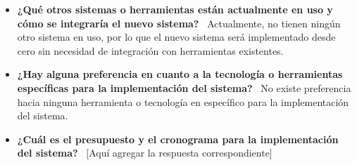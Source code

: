\begin{itemize}
    \item \textbf{¿Qué otros sistemas o herramientas están actualmente en uso y cómo se integraría el nuevo sistema?} \ Actualmente, no tienen ningún otro sistema en uso, por lo que el nuevo sistema será implementado desde cero sin necesidad de integración con herramientas existentes.

    \item \textbf{¿Hay alguna preferencia en cuanto a la tecnología o herramientas específicas para la implementación del sistema?} \ No existe preferencia hacia ninguna herramienta o tecnología en específico para la implementación del sistema.

    \item \textbf{¿Cuál es el presupuesto y el cronograma para la implementación del sistema?} \ [Aquí agregar la respuesta correspondiente] 
\end{itemize}